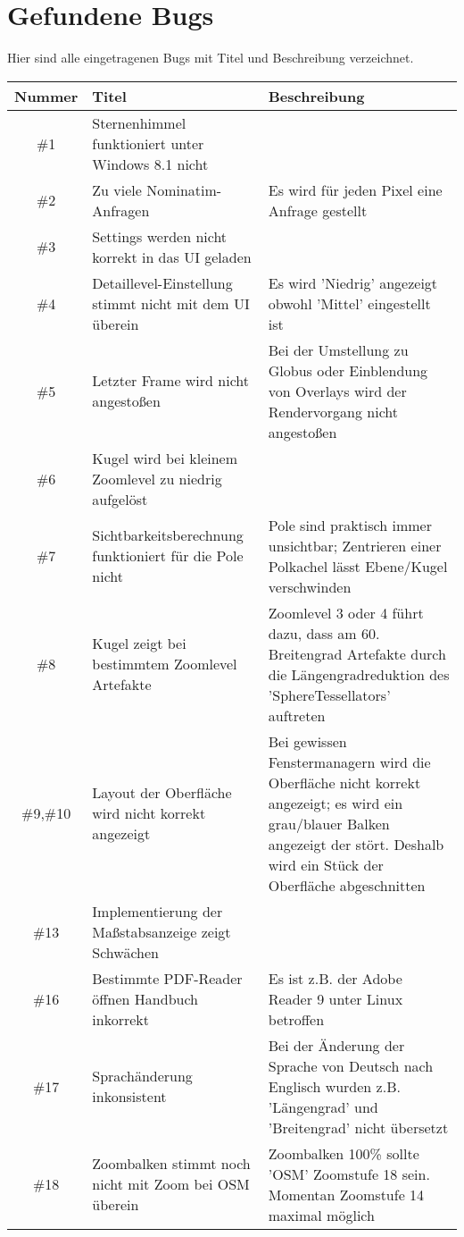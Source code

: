 \documentclass[10pt]{scrreprt}
\begin{document}
\section{Gefundene Bugs}
Hier sind alle eingetragenen Bugs mit Titel und Beschreibung verzeichnet.
\begin{longtable}{|c|p{5.2cm}|p{8.2cm}|}
\hline
Nummer & Titel & Beschreibung \\
\hline
\hline
\#1 & Sternenhimmel funktioniert unter Windows 8.1 nicht & \\
\hline
\#2 & Zu viele Nominatim-Anfragen & Es wird für jeden Pixel eine Anfrage gestellt \\
\hline
\#3 & Settings werden nicht korrekt in das UI geladen & \\
\hline
\#4 & Detaillevel-Einstellung stimmt nicht mit dem UI überein & Es wird 'Niedrig' angezeigt
 obwohl 'Mittel' eingestellt ist \\
\hline
\#5 & Letzter Frame wird nicht angestoßen & Bei der Umstellung zu Globus oder Einblendung von Overlays wird der Rendervorgang nicht angestoßen\\
\hline
\#6 & Kugel wird bei kleinem Zoomlevel zu niedrig aufgelöst & \\
\hline
\#7 & Sichtbarkeitsberechnung funktioniert für die Pole nicht & Pole sind praktisch immer unsichtbar; Zentrieren einer Polkachel lässt Ebene/Kugel verschwinden \\
\hline
\#8 & Kugel zeigt bei bestimmtem Zoomlevel Artefakte & Zoomlevel 3 oder 4 führt dazu, dass am 60. Breitengrad Artefakte durch die Längengradreduktion des 'SphereTessellators' auftreten \\
\hline
\#9,\#10 & Layout der Oberfläche wird nicht korrekt angezeigt & Bei gewissen Fenstermanagern wird die Oberfläche nicht korrekt angezeigt; es wird ein grau/blauer Balken angezeigt der stört. Deshalb wird ein Stück der Oberfläche abgeschnitten \\
\hline
\#13 & Implementierung der Maßstabsanzeige zeigt Schwächen & \\
\hline
\#16 & Bestimmte PDF-Reader öffnen Handbuch inkorrekt & Es ist z.B. der Adobe Reader 9 unter Linux betroffen \\
\hline
\#17 & Sprachänderung inkonsistent & Bei der Änderung der Sprache von Deutsch nach Englisch wurden z.B. 'Längengrad' und 'Breitengrad' nicht übersetzt\\
\hline
\#18 & Zoombalken stimmt noch nicht mit Zoom bei OSM überein & Zoombalken 100\% sollte 'OSM' Zoomstufe 18 sein. Momentan Zoomstufe 14 maximal möglich\\

\end{longtable}
\end{document}
